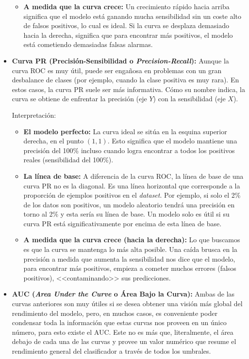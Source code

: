\begin{itemize}
\begin{itemize}
		\item \textbf{A medida que la curva crece:} Un crecimiento rápido hacia arriba significa que el modelo está ganando mucha sensibilidad sin un coste alto de falsos positivos, lo cual es ideal. Si la curva se desplaza demasiado hacia la derecha, significa que para encontrar más positivos, el modelo está cometiendo demasiadas falsas alarmas.
	\end{itemize}
	
	\item \textbf{Curva PR (Precisión-Sensibilidad o \textit{Precision-Recall}):} Aunque la curva ROC es muy útil, puede ser engañosa en problemas con un gran desbalance de clases (por ejemplo, cuando la clase positiva es muy rara). En estos casos, la curva PR suele ser más informativa. Cómo su nombre indica, la curva se obtiene de enfrentar la precisión (eje $Y$) con la sensibilidad (eje $X$).
	
	Interpretación:
	
	\begin{itemize}
		\item \textbf{El modelo perfecto:} La curva ideal se sitúa en la esquina superior derecha, en el punto $(1, 1)$. Esto significa que el modelo mantiene una precisión del 100\% incluso cuando logra encontrar a todos los positivos reales (sensibilidad del 100\%).
		
		\item \textbf{La línea de base:} A diferencia de la curva ROC, la línea de base de una curva PR no es la diagonal. Es una línea horizontal que corresponde a la proporción de ejemplos positivos en el \textit{dataset}. Por ejemplo, si solo el 2\% de los datos son positivos, un modelo aleatorio tendrá una precisión en torno al 2\% y esta sería su línea de base. Un modelo solo es útil si su curva PR está significativamente por encima de esta línea de base.
		
		\item \textbf{A medida que la curva crece (hacia la derecha):} Lo que buscamos es que la curva se mantenga lo más alta posible. Una caída brusca en la precisión a medida que aumenta la sensibilidad nos dice que el modelo, para encontrar más positivos, empieza a cometer muchos errores (falsos positivos), <<contaminando>> sus predicciones.
	\end{itemize}
	
	\item \textbf{AUC (\textit{Area Under the Curve} o Área Bajo la Curva):} Ambas de las curvas anteriores son muy útiles si se desea obtener una visión más global del rendimiento del modelo, pero, en muchos casos, es conveniente poder condensar toda la información que estas curvas nos proveen en un único número, para esto existe el AUC. Este no es más que, literalmente, el área debajo de cada una de las curvas y provee un valor numérico que resume el rendimiento general del clasificador a través de todos los umbrales.
	

\end{itemize}
